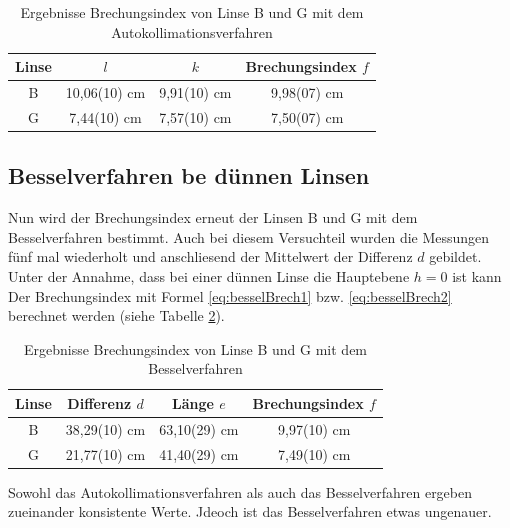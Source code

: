 \documentclass[11pt, a4paper]{article}
\begin{document}
    \begin{table}
        \centering
        \begin{tabular}{c|c|c|c}
            
            Linse & $l$ & $k$ & Brechungsindex $f$ \\ \hline
            B & 10,06(10) $\si{\centi\meter}$& 9,91(10) $\si{\centi\meter}$& 9,98(07) $\si{\centi\meter}$\\ \hline
            G & 7,44(10) $\si{\centi\meter}$& 7,57(10) $\si{\centi\meter}$&  7,50(07) $\si{\centi\meter}$\\ \hline

            
        \end{tabular}
        \caption{Ergebnisse Brechungsindex von Linse B und G mit dem Autokollimationsverfahren}
        \label{tab:BGAutokoll}
    \end{table}
    
    \subsection{Besselverfahren be dünnen Linsen}
    Nun wird der Brechungsindex erneut der Linsen B und G mit dem Besselverfahren bestimmt. Auch bei diesem Versuchteil wurden die Messungen fünf mal wiederholt und anschliesend der Mittelwert der Differenz $d$ gebildet.
    Unter der Annahme, dass bei einer dünnen Linse die Hauptebene $h=0$ ist kann Der Brechungsindex mit Formel \ref{eq:besselBrech1} bzw. \ref{eq:besselBrech2} berechnet werden (siehe Tabelle \ref{tab:BGBessel}).

    \begin{table}
        \centering
        \begin{tabular}{c|c|c|c}
            
            Linse & Differenz $d$ & Länge $e$ & Brechungsindex $f$ \\ \hline
            B & 38,29(10) $\si{\centi\meter}$& 63,10(29) $\si{\centi\meter}$& 9,97(10) $\si{\centi\meter}$\\ \hline
            G & 21,77(10) $\si{\centi\meter}$& 41,40(29) $\si{\centi\meter}$&  7,49(10) $\si{\centi\meter}$\\ \hline

            
        \end{tabular}
        \caption{Ergebnisse Brechungsindex von Linse B und G mit dem Besselverfahren}
        \label{tab:BGBessel}
    \end{table}
     Sowohl das Autokollimationsverfahren als auch das Besselverfahren ergeben zueinander konsistente Werte. Jdeoch ist das Besselverfahren etwas ungenauer.
    

    
    
\end{document}

